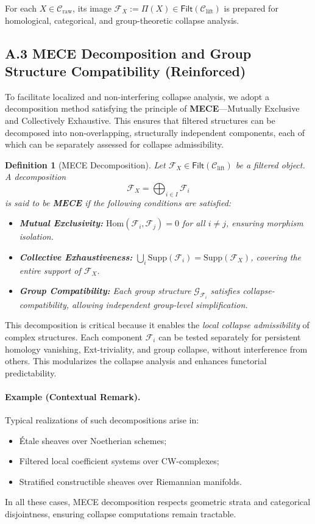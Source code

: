 \documentclass[11pt]{article}
\newtheorem{definition}[theorem]{Definition}
\begin{document}
For each \( X \in \mathcal{C}_{\mathrm{raw}} \), its image \( \mathcal{F}_X := \Pi(X) \in \mathsf{Filt}(\mathcal{C}_{\mathrm{lift}}) \) is prepared for homological, categorical, and group-theoretic collapse analysis.

\subsection*{A.3 MECE Decomposition and Group Structure Compatibility (Reinforced)}

To facilitate localized and non-interfering collapse analysis, we adopt a decomposition method satisfying the principle of \textbf{MECE}—Mutually Exclusive and Collectively Exhaustive. This ensures that filtered structures can be decomposed into non-overlapping, structurally independent components, each of which can be separately assessed for collapse admissibility.

\begin{definition}[MECE Decomposition]
Let \( \mathcal{F}_X \in \mathsf{Filt}(\mathcal{C}_{\mathrm{lift}}) \) be a filtered object. A decomposition 
\[
\mathcal{F}_X = \bigoplus_{i \in I} \mathcal{F}_i
\]
is said to be \textbf{MECE} if the following conditions are satisfied:
\begin{itemize}
    \item \textbf{Mutual Exclusivity:} \( \mathrm{Hom}(\mathcal{F}_i, \mathcal{F}_j) = 0 \) for all \( i \neq j \), ensuring morphism isolation.
    \item \textbf{Collective Exhaustiveness:} \( \bigcup_i \mathrm{Supp}(\mathcal{F}_i) = \mathrm{Supp}(\mathcal{F}_X) \), covering the entire support of \( \mathcal{F}_X \).
    \item \textbf{Group Compatibility:} Each group structure \( \mathcal{G}_{\mathcal{F}_i} \) satisfies collapse-compatibility, allowing independent group-level simplification.
\end{itemize}
\end{definition}

This decomposition is critical because it enables the \emph{local collapse admissibility} of complex structures. Each component \( \mathcal{F}_i \) can be tested separately for persistent homology vanishing, Ext-triviality, and group collapse, without interference from others. This modularizes the collapse analysis and enhances functorial predictability.

\paragraph{Example (Contextual Remark).}
Typical realizations of such decompositions arise in:
\begin{itemize}
  \item Étale sheaves over Noetherian schemes;
  \item Filtered local coefficient systems over CW-complexes;
  \item Stratified constructible sheaves over Riemannian manifolds.
\end{itemize}
In all these cases, MECE decomposition respects geometric strata and categorical disjointness, ensuring collapse computations remain tractable.
\end{document}

